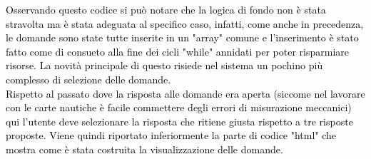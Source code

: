 \textcolor{black}{Osservando questo codice si può notare che la logica di fondo non è stata stravolta ma è stata adeguata al specifico caso, infatti, come anche in precedenza, le domande sono state tutte inserite in un "array" comune e l'inserimento è stato fatto come di consueto alla fine dei cicli "while" annidati per poter risparmiare risorse. La novità principale di questo risiede nel sistema un pochino più complesso di selezione delle domande.\\
Rispetto al passato dove la risposta alle domande era aperta (siccome nel lavorare con le carte nautiche è facile commettere degli errori di misurazione meccanici) qui l'utente deve selezionare la risposta che ritiene giusta rispetto a tre risposte proposte. Viene quindi riportato inferiormente la parte di codice "html" che mostra come è stata costruita la visualizzazione delle domande.}\\

